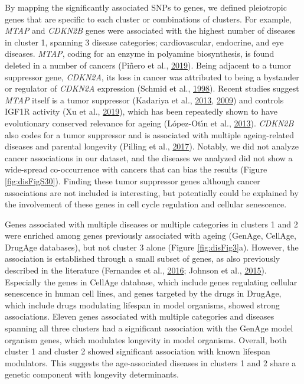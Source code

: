 \documentclass[12pt,twoside]{unicam}
\begin{document}
By mapping the significantly associated SNPs to genes, we defined pleiotropic genes that are specific to each cluster or combinations of clusters. For example, \emph{MTAP} and \emph{CDKN2B} genes were associated with the highest number of diseases in cluster 1, spanning 3 disease categories; cardiovascular, endocrine, and eye diseases. \emph{MTAP}, coding for an enzyme in polyamine biosynthesis, is found deleted in a number of cancers (Piñero et al., \protect\hyperlink{ref-Pinero2019}{2019}). Being adjacent to a tumor suppressor gene, \emph{CDKN2A}, its loss in cancer was attributed to being a bystander or regulator of \emph{CDKN2A} expression (Schmid et al., \protect\hyperlink{ref-Schmid1998}{1998}). Recent studies suggest \emph{MTAP} itself is a tumor suppressor (Kadariya et al., \protect\hyperlink{ref-Kadariya2013}{2013}, \protect\hyperlink{ref-Kadariya2009}{2009}) and controls IGF1R activity (Xu et al., \protect\hyperlink{ref-Xu2019}{2019}), which has been repeatedly shown to have evolutionary conserved relevance for ageing (López-Otı́n et al., \protect\hyperlink{ref-Lopez-Otin2013}{2013}). \emph{CDKN2B} also codes for a tumor suppressor and is associated with multiple ageing-related diseases and parental longevity (Pilling et al., \protect\hyperlink{ref-Pilling2017}{2017}). Notably, we did not analyze cancer associations in our dataset, and the diseases we analyzed did not show a wide-spread co-occurrence with cancers that can bias the results (Figure \ref{fig:disFigS30}). Finding these tumor suppressor genes although cancer associations are not included is interesting, but potentially could be explained by the involvement of these genes in cell cycle regulation and cellular senescence.

Genes associated with multiple diseases or multiple categories in clusters 1 and 2 were enriched among genes previously associated with ageing (GenAge, CellAge, DrugAge databases), but not cluster 3 alone (Figure \ref{fig:disFig3}a). However, the association is established through a small subset of genes, as also previously described in the literature (Fernandes et al., \protect\hyperlink{ref-Fernandes2016}{2016}; Johnson et al., \protect\hyperlink{ref-Johnson2015}{2015}). Especially the genes in CellAge database, which include genes regulating cellular senescence in human cell lines, and genes targeted by the drugs in DrugAge, which include drugs modulating lifespan in model organisms, showed strong associations. Eleven genes associated with multiple categories and diseases spanning all three clusters had a significant association with the GenAge model organism genes, which modulates longevity in model organisms. Overall, both cluster 1 and cluster 2 showed significant association with known lifespan modulators. This suggests the age-associated diseases in clusters 1 and 2 share a genetic component with longevity determinants.
\end{document}
